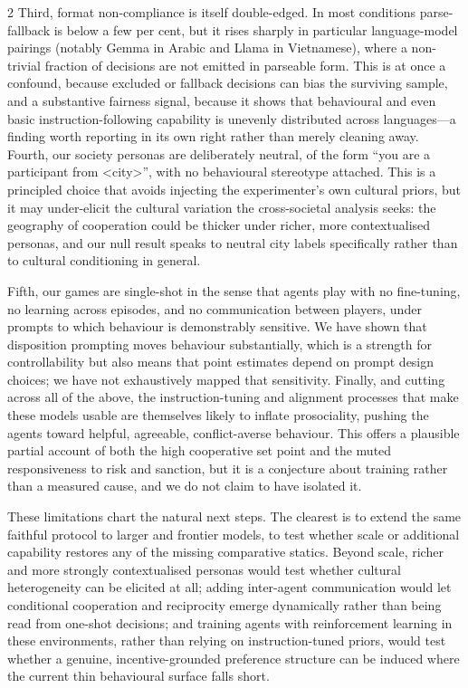 \documentclass[openacc]{rsproca_new}%
\begin{document}
\begin{multicols}{2}
Third, format non-compliance is itself double-edged. In most conditions parse-fallback is below a few per cent, but it rises sharply in particular language-model pairings (notably Gemma in Arabic and Llama in Vietnamese), where a non-trivial fraction of decisions are not emitted in parseable form. This is at once a confound, because excluded or fallback decisions can bias the surviving sample, and a substantive fairness signal, because it shows that behavioural and even basic instruction-following capability is unevenly distributed across languages---a finding worth reporting in its own right rather than merely cleaning away. Fourth, our society personas are deliberately neutral, of the form ``you are a participant from \textless city\textgreater'', with no behavioural stereotype attached. This is a principled choice that avoids injecting the experimenter's own cultural priors, but it may under-elicit the cultural variation the cross-societal analysis seeks: the geography of cooperation could be thicker under richer, more contextualised personas, and our null result speaks to neutral city labels specifically rather than to cultural conditioning in general.

Fifth, our games are single-shot in the sense that agents play with no fine-tuning, no learning across episodes, and no communication between players, under prompts to which behaviour is demonstrably sensitive. We have shown that disposition prompting moves behaviour substantially, which is a strength for controllability but also means that point estimates depend on prompt design choices; we have not exhaustively mapped that sensitivity. Finally, and cutting across all of the above, the instruction-tuning and alignment processes that make these models usable are themselves likely to inflate prosociality, pushing the agents toward helpful, agreeable, conflict-averse behaviour. This offers a plausible partial account of both the high cooperative set point and the muted responsiveness to risk and sanction, but it is a conjecture about training rather than a measured cause, and we do not claim to have isolated it.

These limitations chart the natural next steps. The clearest is to extend the same faithful protocol to larger and frontier models, to test whether scale or additional capability restores any of the missing comparative statics. Beyond scale, richer and more strongly contextualised personas would test whether cultural heterogeneity can be elicited at all; adding inter-agent communication would let conditional cooperation and reciprocity emerge dynamically rather than being read from one-shot decisions; and training agents with reinforcement learning in these environments, rather than relying on instruction-tuned priors, would test whether a genuine, incentive-grounded preference structure can be induced where the current thin behavioural surface falls short.


\end{multicols}
\end{document}
